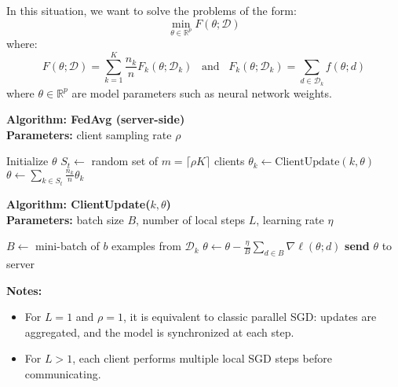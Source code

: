 In this situation, we want to solve the problems of the form:
\begin{equation}
    \min_{\theta \in \mathbb{R}^p} F(\theta; \mathcal{D})
\end{equation}
where:  
\begin{equation}
    F(\theta; \mathcal{D}) = \sum_{k = 1}^K \frac{n_k}{n} F_k(\theta; \mathcal{D}_k) \,\,\, \text{ and } 
    \,\,\, F_k(\theta; \mathcal{D}_k) = \sum_{d \in \mathcal{D}_k} f(\theta; d)
\end{equation}
where $\theta \in \mathbb{R}^p$ are model parameters such as neural network weights.

\begin{multicols}{2}
\noindent
\textbf{Algorithm: FedAvg (server-side)} \\
\textbf{Parameters:} client sampling rate $\rho$ \\
\begin{algorithmic}[1]
    \State Initialize $\theta$
        \State $S_t \gets$ random set of $m = \lceil \rho K \rceil$ clients
            \State $\theta_k \gets \text{ClientUpdate}(k, \theta)$
        \EndFor
        \State $\theta \gets \sum_{k \in S_t} \frac{n_k}{n} \theta_k$
    \EndFor
\end{algorithmic}

\vfill

\columnbreak

\noindent
\textbf{Algorithm: ClientUpdate($k, \theta$)} \\
\textbf{Parameters:} batch size $B$, number of local steps $L$, learning rate $\eta$ \\
\begin{algorithmic}[1]
        \State $B \gets$ mini-batch of $b$ examples from $\mathcal{D}_k$
        \State $\theta \gets \theta - \frac{\eta}{B} \sum_{d \in B} \nabla \ell(\theta; d)$
    \EndFor
    \State \textbf{send} $\theta$ to server
\end{algorithmic}
\end{multicols}

\textbf{Notes:}
\begin{itemize}
    \item For $L = 1$ and $\rho = 1$, it is equivalent to classic parallel SGD: updates are aggregated, and the 
        model is synchronized at each step.
    \item For $L > 1$, each client performs multiple local SGD steps before communicating.
\end{itemize}

